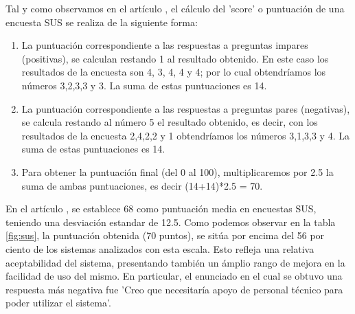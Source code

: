 Tal y como observamos en el artículo \cite{kaya2019usability}, el cálculo del 'score' o puntuación de una encuesta SUS se realiza de la siguiente forma:
\begin{enumerate}
    \item La puntuación correspondiente a las respuestas a preguntas impares (positivas), se calculan restando 1 al resultado obtenido. En este caso los resultados de la encuesta son 4, 3, 4, 4 y 4; por lo cual obtendríamos los números 3,2,3,3 y 3. La suma de estas puntuaciones es 14.
    \item La puntuación correspondiente a las respuestas a preguntas pares (negativas), se calcula restando al número 5 el resultado obtenido, es decir, con los resultados de la encuesta 2,4,2,2 y 1 obtendríamos los números 3,1,3,3 y 4. La suma de estas puntuaciones es 14.
    \item Para obtener la puntuación final (del 0 al 100), multiplicaremos por 2.5 la suma de ambas puntuaciones, es decir (14+14)*2.5 = 70.
\end{enumerate}
En el artículo \cite{sauro2016quantifying}, se establece 68 como puntuación media en encuestas SUS, teniendo una desviación estandar de 12.5. Como podemos observar en la tabla \ref{fig:sus}, la puntuación obtenida (70 puntos), se sitúa por encima del 56 por ciento de los sistemas analizados con esta escala. Esto refleja una relativa aceptabilidad del sistema, presentando también un ámplio rango de mejora en la facilidad de uso del mismo. En particular, el enunciado en el cual se obtuvo una respuesta más negativa fue 'Creo que necesitaría apoyo de personal técnico para poder utilizar el sistema'.

